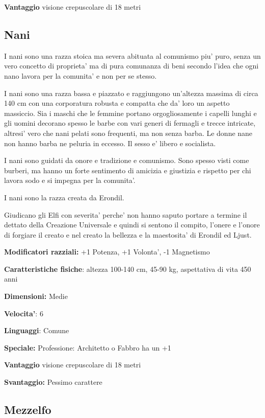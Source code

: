 \documentclass[a4paper,11pt,twoside,openany]{book}
\begin{document}
	\textbf{Vantaggio} visione crepuscolare di 18 metri
	
	\subsection{Nani}
	
	\label{nani}
	
	I nani sono una razza stoica ma severa abituata al comunismo piu' puro, senza un vero concetto di proprieta' ma di pura comunanza di beni secondo l'idea che ogni nano lavora per la comunita' e non per se stesso.
	
	I nani sono una razza bassa e piazzato e raggiungono un'altezza massima di circa 140 cm con una corporatura robusta e compatta che da' loro un aspetto massiccio. Sia i maschi che le femmine portano orgogliosamente i capelli lunghi e gli uomini decorano spesso le barbe con vari generi di fermagli e trecce intricate, altresi' vero che nani pelati sono frequenti, ma non senza barba. Le donne nane non hanno barba ne peluria in eccesso. Il sesso e' libero e socialista.
	
	I nani sono guidati da onore e tradizione e comunismo. Sono spesso visti come burberi, ma hanno un forte sentimento di amicizia e giustizia e rispetto per chi lavora sodo e si impegna per la comunita'.
	
	I nani sono la razza creata da Erondil.
	
	Giudicano gli Elfi con severita' perche' non hanno saputo portare a termine il dettato della Creazione Universale e quindi si sentono il compito, l'onere e l'onore di forgiare il creato e nel creato la bellezza e la maestosita' di Erondil ed Ljust. 
	
	\textbf{Modificatori razziali:} +1 Potenza, +1 Volonta', -1 Magnetismo
	
	\textbf{Caratteristiche fisiche}: altezza 100-140 cm, 45-90 kg, aspettativa
	di vita 450 anni
	
	\textbf{Dimensioni:} Medie
	
	\textbf{Velocita'}: 6
	
	\textbf{Linguaggi}: Comune
	
	\textbf{Speciale:} Professione: Architetto o Fabbro ha un +1
	
	\textbf{Vantaggio} visione crepuscolare di 18 metri
	
	\textbf{Svantaggio:} Pessimo carattere
	
	\subsection{Mezzelfo}
	
\end{document}
